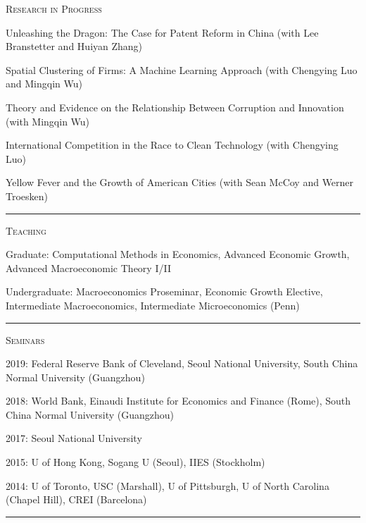\documentclass{article}
\begin{document}
\parbox{\textwidth}{
\parbox[t]{0.28\textwidth}{ \raggedright \noindent \textsc{ Research in Progress } }
\parbox[t]{0.72\textwidth}{ \raggedright

Unleashing the Dragon: The Case for Patent Reform in China (with Lee Branstetter and Huiyan Zhang)
\vspace{0.27cm}

Spatial Clustering of Firms: A Machine Learning Approach (with Chengying Luo and Mingqin Wu)
\vspace{0.27cm}

Theory and Evidence on the Relationship Between Corruption and Innovation (with Mingqin Wu)
\vspace{0.27cm}

International Competition in the Race to Clean Technology (with Chengying Luo)
\vspace{0.27cm}

Yellow Fever and the Growth of American Cities (with Sean McCoy and Werner Troesken)
\vspace{0.27cm}

}
\textcolor{light-gray}{\hrule}
}
\vspace{0.3cm}

\parbox{\textwidth}{
\parbox[t]{0.28\textwidth}{ \raggedright \noindent \textsc{ Teaching } }
\parbox[t]{0.72\textwidth}{ \raggedright

Graduate: Computational Methods in Economics, Advanced Economic Growth, Advanced Macroeconomic Theory I/II
\vspace{0.27cm}

Undergraduate: Macroeconomics Proseminar, Economic Growth Elective, Intermediate Macroeconomics, Intermediate Microeconomics (Penn)
\vspace{0.27cm}

}
\textcolor{light-gray}{\hrule}
}
\vspace{0.3cm}

\parbox{\textwidth}{
\parbox[t]{0.28\textwidth}{ \raggedright \noindent \textsc{ Seminars } }
\parbox[t]{0.72\textwidth}{ \raggedright

2019: Federal Reserve Bank of Cleveland, Seoul National University, South China Normal University (Guangzhou)
\vspace{0.27cm}

2018: World Bank, Einaudi Institute for Economics and Finance (Rome), South China Normal University (Guangzhou)
\vspace{0.27cm}

2017: Seoul National University
\vspace{0.27cm}

2015: U of Hong Kong, Sogang U (Seoul), IIES (Stockholm)
\vspace{0.27cm}

2014: U of Toronto, USC (Marshall), U of Pittsburgh, U of North Carolina (Chapel Hill), CREI (Barcelona)
\vspace{0.27cm}

}
\textcolor{light-gray}{\hrule}
}
\vspace{0.3cm}
\end{document}
